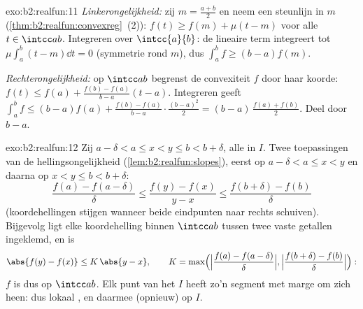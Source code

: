 \begin{solution}{exo:b2:realfun:11}
\emph{Linkerongelijkheid:} zij $m = \frac{a+b}2$ en neem een
steunlijn in $m$ (\cref{thm:b2:realfun:convexreg}~(2)): $f(t) \geq
f(m) + \mu(t - m)$ voor alle $t \in \intcc ab$. Integreren over
$\intcc{a}{b}$: de lineaire term integreert tot $\mu\int_a^b(t -
m)\dd t = 0$ (symmetrie rond $m$), dus $\int_a^b f \geq (b -
a)f(m)$.

\emph{Rechterongelijkheid:} op $\intcc ab$ begrenst de convexiteit
$f$ door haar koorde: $f(t) \leq f(a) + \frac{f(b) - f(a)}{b -
a}(t - a)$. Integreren geeft $\int_a^b f \leq (b-a)f(a) +
\frac{f(b) - f(a)}{b - a}\cdot\frac{(b-a)^2}2 = (b -
a)\,\frac{f(a) + f(b)}2$. Deel door $b - a$.
\end{solution}

\begin{solution}{exo:b2:realfun:12}
Zij $a - \delta < a \leq x < y \leq b < b + \delta$, alle in $I$.
Twee toepassingen van de hellingsongelijkheid
(\cref{lem:b2:realfun:slopes}), eerst op $a - \delta < a \leq x <
y$ en daarna op $x < y \leq b < b + \delta$:
\[
\frac{f(a) - f(a - \delta)}{\delta}
\leq \frac{f(y) - f(x)}{y - x}
\leq \frac{f(b + \delta) - f(b)}{\delta}
\]
(koordehellingen stijgen wanneer beide eindpunten naar rechts
schuiven). Bijgevolg ligt elke koordehelling binnen $\intcc ab$
tussen twee vaste getallen ingeklemd, en is
\[
\abs{f(y) - f(x)} \leq K\,\abs{y - x},
\qquad
K = \max\Bigl(\Bigl|\frac{f(a) - f(a-\delta)}{\delta}\Bigr|,
\Bigl|\frac{f(b+\delta) - f(b)}{\delta}\Bigr|\Bigr):
\]
$f$ is dus  op $\intcc ab$. Elk punt van het  $I$
heeft zo'n segment met marge om zich heen: dus lokaal , en
daarmee (opnieuw)  op $I$.
\end{solution}

